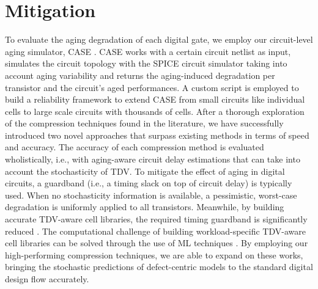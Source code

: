 \section{Mitigation}

To evaluate the aging degradation of each digital gate, we employ our circuit-level aging simulator, CASE \cite{martin-lloretCASEReliabilitySimulation2017}. CASE works with a certain circuit netlist as input, simulates the circuit topology with the SPICE circuit simulator taking into account aging variability and returns the aging-induced degradation per transistor and the circuit's aged performances. A custom script is employed to build a reliability framework to extend CASE from small circuits like individual cells to large scale circuits with thousands of cells. After a thorough exploration of the compression techniques found in the literature, we have successfully introduced two novel approaches that surpass existing methods in terms of speed and accuracy. The accuracy of each compression method is evaluated wholistically, i.e., with aging-aware circuit delay estimations that can take into account the stochasticity of \gls{TDV}. To mitigate the effect of aging in digital circuits, a guardband (i.e., a timing slack on top of circuit delay) is typically used. When no stochasticity information is available, a pessimistic, worst-case degradation is uniformly applied to all transistors. Meanwhile, by building accurate \gls{TDV}-aware cell libraries, the required timing guardband is significantly reduced \cite{vansantenModelingMitigatingTimeDependent2019}. The computational challenge of building workload-specific \gls{TDV}-aware cell libraries can be solved through the use of ML techniques \cite{klemmeEfficientLearningStrategies2022, klemmeMachineLearningCircuit2021, klemmeScalableMachineLearning2022a}. By employing our high-performing compression techniques, we are able to expand on these works, bringing the stochastic predictions of defect-centric models to the standard digital design flow accurately. 



